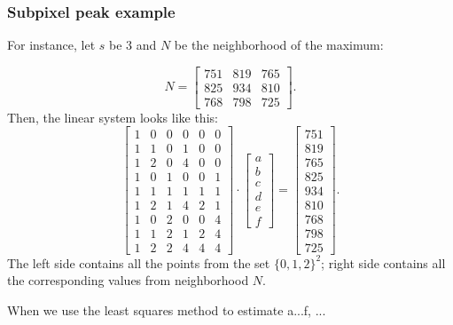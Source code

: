 \subsubsection{Subpixel peak example}

For instance, let $s$ be 3 and $N$ be the neighborhood of the maximum:

\[
N =
\begin{bmatrix}
	751 & 819 & 765 \\
	825 & 934 & 810 \\
	768 & 798 & 725
\end{bmatrix}.
\]
Then, the linear system looks like this:
\[
\begin{bmatrix}
 1 & 0 & 0 & 0 & 0 & 0\\
 1 & 1 & 0 & 1 & 0 & 0\\
 1 & 2 & 0 & 4 & 0 & 0\\
 1 & 0 & 1 & 0 & 0 & 1\\
 1 & 1 & 1 & 1 & 1 & 1\\
 1 & 2 & 1 & 4 & 2 & 1\\
 1 & 0 & 2 & 0 & 0 & 4\\
 1 & 1 & 2 & 1 & 2 & 4\\
 1 & 2 & 2 & 4 & 4 & 4
\end{bmatrix}
\cdot
\begin{bmatrix}
a \\ b \\ c \\ d \\ e \\ f
\end{bmatrix}
=
\begin{bmatrix}
751 \\ 819 \\ 765 \\ 825 \\ 934 \\ 810 \\ 768 \\ 798 \\ 725
\end{bmatrix}.
\]
The left side contains all the points from the set $\{0,1,2\}^2$; right side contains all the corresponding values from neighborhood $N$.

When we use the least squares method to estimate a...f, ... 